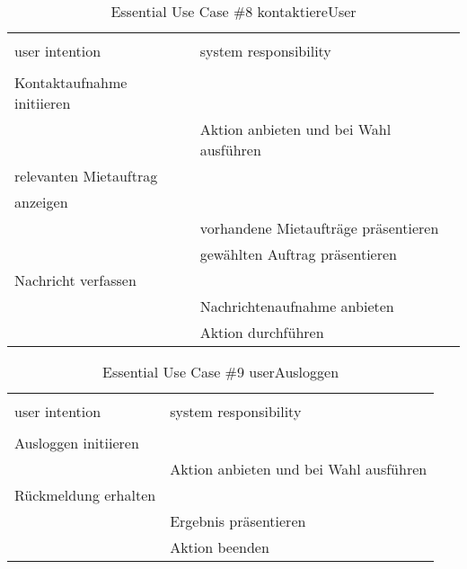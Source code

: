 \begin{table}[H]
\caption{Essential Use Case \#8 kontaktiereUser }
\centering
\begin{tabular}{l l}
\\ [-0.5ex]

\hline\hline
\\ [-0.5ex]
user intention & system responsibility
\\ [1.5ex]
\hline
\\ [-0.5ex]
Kontaktaufnahme initiieren &                                 \\[1ex]
                     & Aktion anbieten und bei Wahl ausführen   \\[1ex]
relevanten Mietauftrag     &                                 \\[1ex] 
anzeigen             &                                 \\[1ex] 
                     & vorhandene Mietaufträge präsentieren        \\[1ex]
                     & gewählten Auftrag präsentieren        \\[1ex]
Nachricht verfassen        &                                 \\[1ex]
                     & Nachrichtenaufnahme anbieten             \\[1ex]
                     & Aktion durchführen                 \\[1ex]
\hline
\end{tabular}
\label{tab:kontaktaufnahme}
\end{table}

\begin{table}[H]
\caption{Essential Use Case \#9 userAusloggen }
\centering
\begin{tabular}{l l}
\\ [-0.5ex]

\hline\hline
\\ [-0.5ex]
user intention & system responsibility
\\ [1.5ex]
\hline
\\ [-0.5ex]
Ausloggen initiieren    &                                 \\[1ex]
                     & Aktion anbieten und bei Wahl ausführen   \\[1ex]
Rückmeldung erhalten    &                                 \\[1ex]
                     & Ergebnis präsentieren                 \\[1ex]
                     & Aktion beenden                     \\[1ex]

\hline
\end{tabular}
\label{tab:ausloggen}
\end{table}

